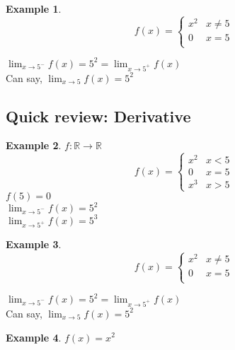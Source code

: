 \documentclass[twocolumn,20pt,fleqn]{extarticle}
\theoremstyle{plain}
\theoremstyle{definition}
\newtheorem*{example}{Example}
\theoremstyle{remark}
\begin{document}
\begin{example}
  \[f(x) =
      \begin{cases}
        x^2 & x  \neq  5\\
        0 & x = 5\\
        
      \end{cases}
      \]
      
      


$\displaystyle\lim_{x \to 5^-} f(x) = 5^2  = \displaystyle\lim_{x \to 5^+} f(x)$\\
Can say, $\displaystyle\lim_{x \to 5} f(x) = 5^2$
\end{example}

\newpage



\clearpage



\subsection{Quick review: Derivative}
\begin{example}
  $f : \mathbb{R}\to \mathbb{R}$
  \[f(x) =
      \begin{cases}
        x^2 & x < 5\\
        0 & x = 5\\
        x^3 & x > 5
      \end{cases}
      \]
      $f(5)=0$\\
$\displaystyle\lim_{x \to 5^-} f(x)  = 5^2$\\
$\displaystyle\lim_{x \to 5^+} f(x)  = 5^3$
\end{example}


\begin{example}
  \[f(x) =
      \begin{cases}
        x^2 & x  \neq  5\\
        0 & x = 5\\
        
      \end{cases}
      \]
      
      


$\displaystyle\lim_{x \to 5^-} f(x) = 5^2  = \displaystyle\lim_{x \to 5^+} f(x)$\\
Can say, $\displaystyle\lim_{x \to 5} f(x) = 5^2$
\end{example}

\newpage
\begin{example}
$f(x) = x^2$\\
\end{example}
\end{document}

